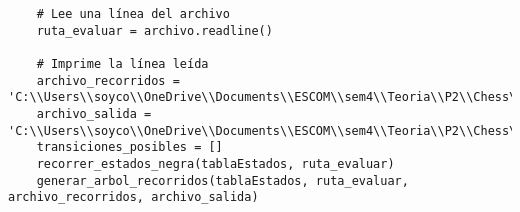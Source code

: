\begin{lstlisting}
    # Lee una línea del archivo
    ruta_evaluar = archivo.readline()

    # Imprime la línea leída
    archivo_recorridos = 'C:\\Users\\soyco\\OneDrive\\Documents\\ESCOM\\sem4\\Teoria\\P2\\Chess\\output\\recorridos_negra.txt'
    archivo_salida = 'C:\\Users\\soyco\\OneDrive\\Documents\\ESCOM\\sem4\\Teoria\\P2\\Chess\\output\\arbol_negra.dot'
    transiciones_posibles = []
    recorrer_estados_negra(tablaEstados, ruta_evaluar)
    generar_arbol_recorridos(tablaEstados, ruta_evaluar, archivo_recorridos, archivo_salida)
    

\end{lstlisting}


